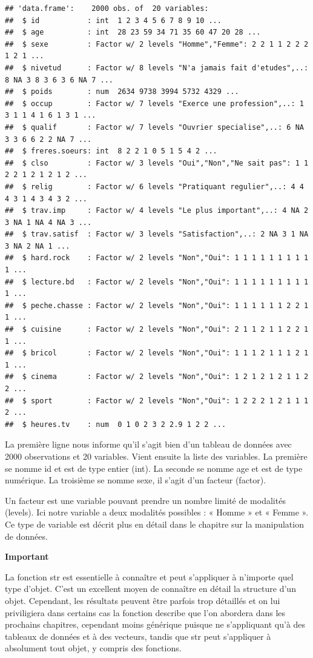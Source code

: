 \documentclass[
]{book}
\begin{document}
\begin{verbatim}
## 'data.frame':    2000 obs. of  20 variables:
##  $ id           : int  1 2 3 4 5 6 7 8 9 10 ...
##  $ age          : int  28 23 59 34 71 35 60 47 20 28 ...
##  $ sexe         : Factor w/ 2 levels "Homme","Femme": 2 2 1 1 2 2 2 1 2 1 ...
##  $ nivetud      : Factor w/ 8 levels "N'a jamais fait d'etudes",..: 8 NA 3 8 3 6 3 6 NA 7 ...
##  $ poids        : num  2634 9738 3994 5732 4329 ...
##  $ occup        : Factor w/ 7 levels "Exerce une profession",..: 1 3 1 1 4 1 6 1 3 1 ...
##  $ qualif       : Factor w/ 7 levels "Ouvrier specialise",..: 6 NA 3 3 6 6 2 2 NA 7 ...
##  $ freres.soeurs: int  8 2 2 1 0 5 1 5 4 2 ...
##  $ clso         : Factor w/ 3 levels "Oui","Non","Ne sait pas": 1 1 2 2 1 2 1 2 1 2 ...
##  $ relig        : Factor w/ 6 levels "Pratiquant regulier",..: 4 4 4 3 1 4 3 4 3 2 ...
##  $ trav.imp     : Factor w/ 4 levels "Le plus important",..: 4 NA 2 3 NA 1 NA 4 NA 3 ...
##  $ trav.satisf  : Factor w/ 3 levels "Satisfaction",..: 2 NA 3 1 NA 3 NA 2 NA 1 ...
##  $ hard.rock    : Factor w/ 2 levels "Non","Oui": 1 1 1 1 1 1 1 1 1 1 ...
##  $ lecture.bd   : Factor w/ 2 levels "Non","Oui": 1 1 1 1 1 1 1 1 1 1 ...
##  $ peche.chasse : Factor w/ 2 levels "Non","Oui": 1 1 1 1 1 1 2 2 1 1 ...
##  $ cuisine      : Factor w/ 2 levels "Non","Oui": 2 1 1 2 1 1 2 2 1 1 ...
##  $ bricol       : Factor w/ 2 levels "Non","Oui": 1 1 1 2 1 1 1 2 1 1 ...
##  $ cinema       : Factor w/ 2 levels "Non","Oui": 1 2 1 2 1 2 1 1 2 2 ...
##  $ sport        : Factor w/ 2 levels "Non","Oui": 1 2 2 2 1 2 1 1 1 2 ...
##  $ heures.tv    : num  0 1 0 2 3 2 2.9 1 2 2 ...
\end{verbatim}

La première ligne nous informe qu'il s'agit bien d'un tableau de données avec 2000 observations et 20 variables. Vient ensuite la liste des variables. La première se nomme id et est de type entier (int). La seconde se nomme age et est de type numérique. La troisième se nomme sexe, il s'agit d'un facteur (factor).

Un facteur est une variable pouvant prendre un nombre limité de modalités (levels). Ici notre variable a deux modalités possibles : « Homme » et « Femme ». Ce type de variable est décrit plus en détail dans le chapitre sur la manipulation de données.

\textbf{Important}

La fonction str est essentielle à connaître et peut s'appliquer à n'importe quel type d'objet. C'est un excellent moyen de connaître en détail la structure d'un objet. Cependant, les résultats peuvent être parfois trop détaillés et on lui priviligiera dans certains cas la fonction describe que l'on abordera dans les prochains chapitres, cependant moins générique puisque ne s'appliquant qu'à des tableaux de données et à des vecteurs, tandis que str peut s'appliquer à absolument tout objet, y compris des fonctions.
\end{document}
